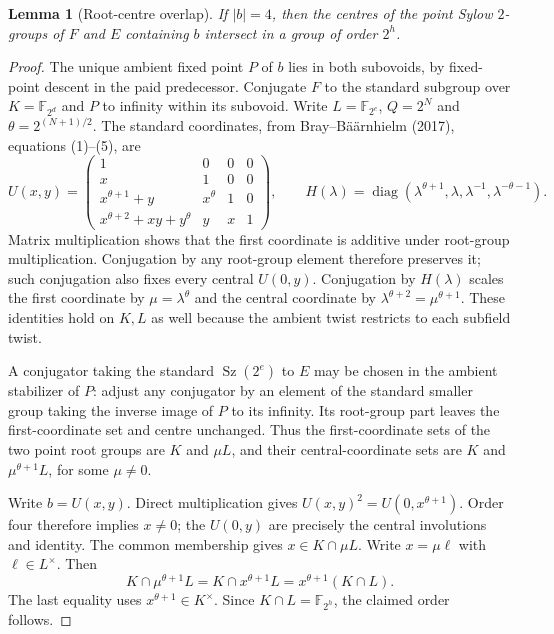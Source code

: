 \documentclass[11pt,a4paper]{article}
\newtheorem{lemma}{Lemma}\newtheorem{proposition}[lemma]{Proposition}
\newcommand{\Sz}{\operatorname{Sz}}
\begin{document}
\begin{lemma}[Root-centre overlap]\label{root}
If $|b|=4$, then the centres of the point Sylow $2$-groups of $F$ and
$E$ containing $b$ intersect in a group of order $2^h$.
\end{lemma}
\begin{proof}
The unique ambient fixed point $P$ of $b$ lies in both subovoids, by
fixed-point descent in the paid predecessor. Conjugate $F$ to the
standard subgroup over $K=\mathbb F_{2^d}$ and $P$ to infinity within
its subovoid. Write $L=\mathbb F_{2^e}$, $Q=2^N$ and
$\theta=2^{(N+1)/2}$.
The standard coordinates, from Bray--B\"a\"arnhielm (2017), equations
(1)--(5), are
\[
 U(x,y)=\begin{pmatrix}
 1&0&0&0\\x&1&0&0\\x^{\theta+1}+y&x^\theta&1&0\\
 x^{\theta+2}+xy+y^\theta&y&x&1
 \end{pmatrix},\qquad
 H(\lambda)=\operatorname{diag}(\lambda^{\theta+1},\lambda,
 \lambda^{-1},\lambda^{-\theta-1}).
\]
Matrix multiplication shows that the first coordinate is additive
under root-group multiplication. Conjugation by any root-group element
therefore preserves it; such conjugation also fixes every central
$U(0,y)$. Conjugation by $H(\lambda)$ scales the first coordinate by
$\mu=\lambda^\theta$ and the central coordinate by
$\lambda^{\theta+2}=\mu^{\theta+1}$. These identities hold on $K,L$
as well because the ambient twist restricts to each subfield twist.

A conjugator taking the standard $\Sz(2^e)$ to $E$ may be chosen in the
ambient stabilizer of $P$: adjust any conjugator by an element of the
standard smaller group taking the inverse image of $P$ to its infinity.
Its root-group part leaves the first-coordinate set and centre
unchanged. Thus the first-coordinate sets of the two point root groups
are $K$ and $\mu L$, and their central-coordinate sets are $K$ and
$\mu^{\theta+1}L$, for some $\mu\ne0$.

Write $b=U(x,y)$. Direct multiplication gives
$U(x,y)^2=U(0,x^{\theta+1})$. Order four therefore implies $x\ne0$;
the $U(0,y)$ are precisely the central involutions and identity. The common membership
gives $x\in K\cap\mu L$. Write $x=\mu\ell$ with
$\ell\in L^\times$. Then
\[
 K\cap\mu^{\theta+1}L
 =K\cap x^{\theta+1}L
 =x^{\theta+1}(K\cap L).
\]
The last equality uses $x^{\theta+1}\in K^\times$. Since
$K\cap L=\mathbb F_{2^h}$, the claimed order follows.
\end{proof}
\end{document}
